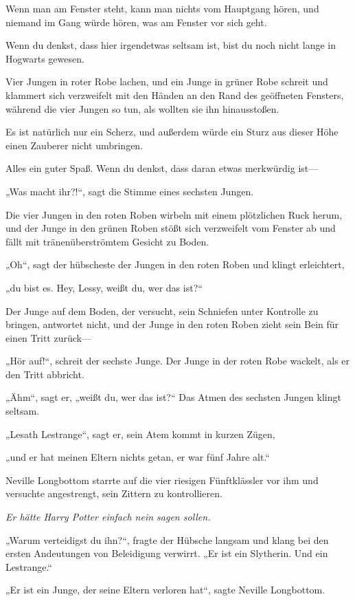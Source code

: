 {Wenn man am Fenster steht, kann man nichts vom Hauptgang hören, und niemand im Gang würde hören, was am Fenster vor sich geht.

Wenn du denkst, dass hier irgendetwas seltsam ist, bist du noch nicht lange in Hogwarts gewesen.

Vier Jungen in roter Robe lachen, und ein Junge in grüner Robe schreit und klammert sich verzweifelt mit den Händen an den Rand des geöffneten Fensters, während die vier Jungen so tun, als wollten sie ihn hinausstoßen.

Es ist natürlich nur ein Scherz, und außerdem würde ein Sturz aus dieser Höhe einen Zauberer nicht umbringen.

Alles ein guter Spaß. Wenn du denkst, dass daran etwas merkwürdig ist—

„Was macht ihr?!“, sagt die Stimme eines sechsten Jungen.

Die vier Jungen in den roten Roben wirbeln mit einem plötzlichen Ruck herum, und der Junge in den grünen Roben stößt sich verzweifelt vom Fenster ab und fällt mit tränenüberströmtem Gesicht zu Boden.

„Oh“, sagt der hübscheste der Jungen in den roten Roben und klingt erleichtert,

„du bist es. Hey, Lessy, weißt du, wer das ist?“

Der Junge auf dem Boden, der versucht, sein Schniefen unter Kontrolle zu bringen, antwortet nicht, und der Junge in den roten Roben zieht sein Bein für einen Tritt zurück—

„Hör auf!“, schreit der sechste Junge. Der Junge in der roten Robe wackelt, als er den Tritt abbricht.

„Ähm“, sagt er, „weißt du, wer das ist?“ Das Atmen des sechsten Jungen klingt seltsam.

„Lesath Lestrange“, sagt er, sein Atem kommt in kurzen Zügen,

„und er hat meinen Eltern nichts getan, er war fünf Jahre alt.“

Neville Longbottom starrte auf die vier riesigen Fünftklässler vor ihm und versuchte angestrengt, sein Zittern zu kontrollieren.

\emph{Er hätte Harry Potter einfach nein sagen sollen.}

„Warum verteidigst du ihn?“, fragte der Hübsche langsam und klang bei den ersten Andeutungen von Beleidigung verwirrt. „Er ist ein Slytherin. Und ein Lestrange.“

„Er ist ein Junge, der seine Eltern verloren hat“, sagte Neville Longbottom.

}
